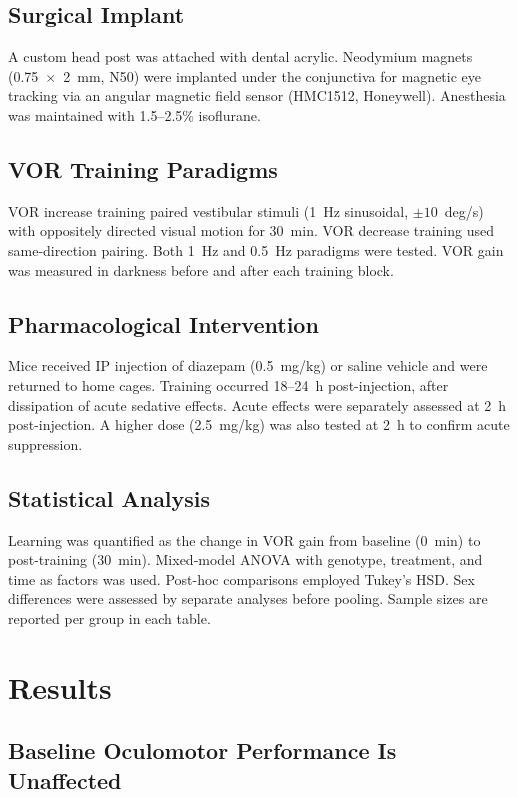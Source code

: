 \documentclass[11pt]{article}
\begin{document}
\subsection{Surgical Implant}

A custom head post was attached with dental acrylic. Neodymium magnets (0.75~$\times$~2~mm, N50) were implanted under the conjunctiva for magnetic eye tracking via an angular magnetic field sensor (HMC1512, Honeywell). Anesthesia was maintained with 1.5--2.5\% isoflurane.

\subsection{VOR Training Paradigms}

VOR increase training paired vestibular stimuli (1~Hz sinusoidal, $\pm 10$~deg/s) with oppositely directed visual motion for 30~min. VOR decrease training used same-direction pairing. Both 1~Hz and 0.5~Hz paradigms were tested. VOR gain was measured in darkness before and after each training block.

\subsection{Pharmacological Intervention}

Mice received IP injection of diazepam (0.5~mg/kg) or saline vehicle and were returned to home cages. Training occurred 18--24~h post-injection, after dissipation of acute sedative effects. Acute effects were separately assessed at 2~h post-injection. A higher dose (2.5~mg/kg) was also tested at 2~h to confirm acute suppression.

\subsection{Statistical Analysis}

Learning was quantified as the change in VOR gain from baseline (0~min) to post-training (30~min). Mixed-model ANOVA with genotype, treatment, and time as factors was used. Post-hoc comparisons employed Tukey's HSD. Sex differences were assessed by separate analyses before pooling. Sample sizes are reported per group in each table.

\section{Results}

\subsection{Baseline Oculomotor Performance Is Unaffected}
\end{document}
